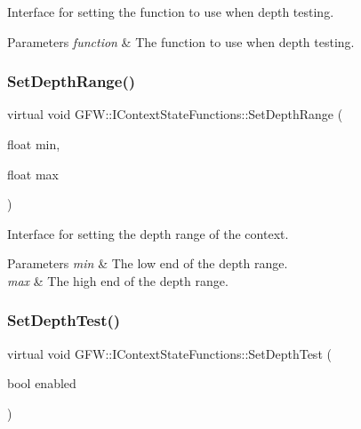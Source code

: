 Interface for setting the function to use when depth testing. 


\begin{DoxyParams}{Parameters}
{\em function} & The function to use when depth testing. \\
\hline
\end{DoxyParams}
\mbox{\label{class_g_f_w_1_1_i_context_state_functions_aeaaf04605dbc74af5a0aa2e2e0e2c355}} 
\subsubsection{\texorpdfstring{Set\+Depth\+Range()}{SetDepthRange()}}
{\footnotesize\ttfamily virtual void G\+F\+W\+::\+I\+Context\+State\+Functions\+::\+Set\+Depth\+Range (\begin{DoxyParamCaption}\item[{float}]{min,  }\item[{float}]{max }\end{DoxyParamCaption})\hspace{0.3cm}{\ttfamily [pure virtual]}}



Interface for setting the depth range of the context. 


\begin{DoxyParams}{Parameters}
{\em min} & The low end of the depth range. \\
\hline
{\em max} & The high end of the depth range. \\
\hline
\end{DoxyParams}
\mbox{\label{class_g_f_w_1_1_i_context_state_functions_af89da61bb0d9cd9d224cc78e3d22c9b7}} 
\subsubsection{\texorpdfstring{Set\+Depth\+Test()}{SetDepthTest()}}
{\footnotesize\ttfamily virtual void G\+F\+W\+::\+I\+Context\+State\+Functions\+::\+Set\+Depth\+Test (\begin{DoxyParamCaption}\item[{bool}]{enabled }\end{DoxyParamCaption})\hspace{0.3cm}{\ttfamily [pure virtual]}}



